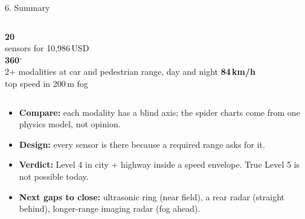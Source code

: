 \documentclass[aspectratio=169,11pt]{beamer}
\begin{document}
\begin{frame}{6. Summary}
  \vspace{0.4em}
  \begin{columns}[t]
    \centering
    {\Huge\textbf{20}}\\[0.3em]
    sensors for 10,986\,USD\\
    \centering
    {\Huge\textbf{360$^\circ$}}\\[0.3em]
    2+ modalities at car and pedestrian range, day and night
    \centering
    {\Huge\textbf{84\,km/h}}\\[0.3em]
    top speed in 200\,m fog
  \end{columns}

  \vspace{1.5em}
  \small
  \begin{itemize}
    \item \textbf{Compare:} each modality has a blind axis; the spider charts come from one physics model, not opinion.
    \item \textbf{Design:} every sensor is there because a required range asks for it.
    \item \textbf{Verdict:} Level 4 in city + highway inside a speed envelope. True Level 5 is not possible today.
    \item \textbf{Next gaps to close:} ultrasonic ring (near field), a rear radar (straight behind),
      longer-range imaging radar (fog ahead).
  \end{itemize}
\end{frame}
\end{document}

